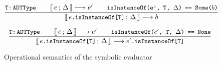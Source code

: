 \documentclass[a4paper,twoside]{article}
\newcommand{\lb}[2]{\llbracket\, #1\,;\, #2\, \rrbracket}
\newcommand{\stt}[1]{\texttt{\small{#1}}}
\begin{document}
\begin{figure}[htb]
\begin{framed}
\begin{equation}
\dfrac{
  \stt{T:\,ADTType} \qquad
  \lb{e}{\Delta} \longrightarrow e' \qquad
  \stt{isInstanceOf(e', T, $\Delta$) == Some($b$)}
}{
  \lb{\stt{$e$.isInstanceOf[T]}}{\Delta} \longrightarrow b
}
\end{equation}

\begin{equation}
\dfrac{
  \stt{T:\,ADTType} \qquad
  \lb{e}{\Delta} \longrightarrow e' \qquad
  \stt{isInstanceOf($e'$, T, $\Delta$) == None}
}{
  \lb{\stt{$e$.isInstanceOf[T]}}{\Delta} \longrightarrow \stt{$e'$.isInstanceOf[T]}
}
\end{equation}

\end{framed}
\vspace{-10pt}
\caption{Operational semantics of the symbolic evaluator \label{fig:symbolicsem}}
\end{figure}

\end{document}
